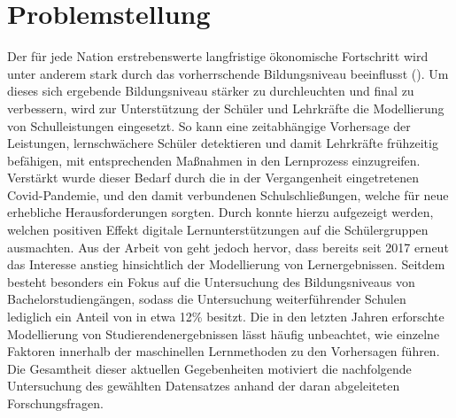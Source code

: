 \chapter[Problemstellung]{Problemstellung}

Der für jede Nation erstrebenswerte langfristige ökonomische Fortschritt wird unter anderem stark durch das vorherrschende Bildungsniveau beeinflusst (\cite[S. 1]{Cortez2008UsingDM}). 
Um dieses sich ergebende Bildungsniveau stärker zu durchleuchten und final zu verbessern, wird zur Unterstützung der Schüler und Lehrkräfte die Modellierung von Schulleistungen eingesetzt. \cite[S. 1]{Cortez2008UsingDM} 
So kann eine zeitabhängige Vorhersage der Leistungen, lernschwächere Schüler detektieren und damit Lehrkräfte frühzeitig befähigen, mit entsprechenden Maßnahmen in den Lernprozess einzugreifen. \cite[S. 2]{Namoun.2021} 
Verstärkt wurde dieser Bedarf durch die in der Vergangenheit eingetretenen Covid-Pandemie, und den damit verbundenen Schulschließungen, welche für neue erhebliche Herausforderungen sorgten. \cite[S. 2]{Clark.2021} 
Durch \cite[S. 13]{Clark.2021} konnte hierzu aufgezeigt werden, welchen positiven Effekt digitale Lernunterstützungen auf die Schülergruppen ausmachten.
Aus der Arbeit von \cite[S. 9]{Namoun.2021} geht jedoch hervor, dass bereits seit 2017 erneut das Interesse anstieg hinsichtlich der Modellierung von Lernergebnissen.
Seitdem besteht besonders ein Fokus auf die Untersuchung des Bildungsniveaus von Bachelorstudiengängen, sodass die Untersuchung weiterführender Schulen lediglich ein Anteil von in etwa 12\% besitzt. \cite[S. 11]{Namoun.2021} 
Die in den letzten Jahren erforschte Modellierung von Studierendenergebnissen lässt häufig unbeachtet, wie einzelne Faktoren innerhalb der maschinellen Lernmethoden zu den Vorhersagen führen. \cite[S. 19]{Namoun.2021}
Die Gesamtheit dieser aktuellen Gegebenheiten motiviert die nachfolgende Untersuchung des gewählten Datensatzes anhand der daran abgeleiteten Forschungsfragen.